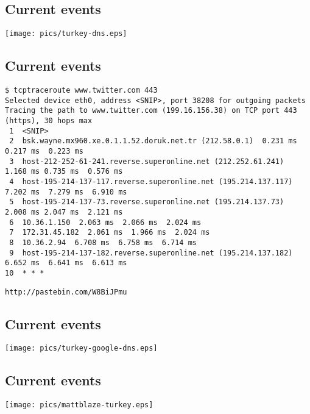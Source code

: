\documentclass[xga]{xdvislides}
\begin{document}
\subsection{Current events}
\vspace*{\fill}
\begin{center}
	\texttt{[image: pics/turkey-dns.eps]} \\
\end{center}
\vspace*{\fill}

\subsection{Current events}
\begin{verbatim}
$ tcptraceroute www.twitter.com 443
Selected device eth0, address <SNIP>, port 38208 for outgoing packets
Tracing the path to www.twitter.com (199.16.156.38) on TCP port 443 (https), 30 hops max
 1  <SNIP>
 2  bsk.wayne.mx960.xe.0.1.1.52.doruk.net.tr (212.58.0.1)  0.231 ms  0.217 ms  0.223 ms
 3  host-212-252-61-241.reverse.superonline.net (212.252.61.241)  1.168 ms 0.735 ms  0.576 ms
 4  host-195-214-137-117.reverse.superonline.net (195.214.137.117)  7.202 ms  7.279 ms  6.910 ms
 5  host-195-214-137-73.reverse.superonline.net (195.214.137.73)  2.008 ms 2.047 ms  2.121 ms
 6  10.36.1.150  2.063 ms  2.066 ms  2.024 ms
 7  172.31.45.182  2.061 ms  1.966 ms  2.024 ms
 8  10.36.2.94  6.708 ms  6.758 ms  6.714 ms
 9  host-195-214-137-182.reverse.superonline.net (195.214.137.182)  6.652 ms  6.641 ms  6.613 ms
10  * * *
\end{verbatim}

{\tt http://pastebin.com/W8BiJPmu}

\subsection{Current events}
\vspace*{\fill}
\begin{center}
	\texttt{[image: pics/turkey-google-dns.eps]} \\
\end{center}
\vspace*{\fill}


\subsection{Current events}
\vspace*{\fill}
\begin{center}
	\texttt{[image: pics/mattblaze-turkey.eps]} \\
\end{center}
\vspace*{\fill}
\end{document}
